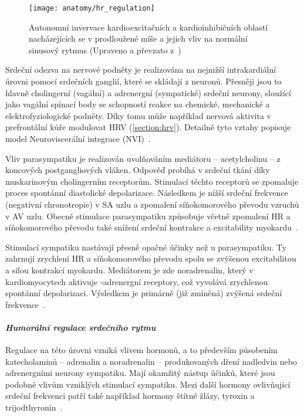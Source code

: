 \begin{figure}[h]
	\begin{center}
		\texttt{[image: anatomy/hr\_regulation]}
		\caption{Autonomní invervace kardioexcitačních a kardioinhibičních
			oblastí nacházejících se v prodloužené míše a jejich vliv na
			normální sinusový rytmus (Upraveno a převzato z~\cite{OpenStax})}
		\label{fig:hr_regulation}
	\end{center}
\end{figure}

Srdeční odezva na nervové podněty je realizována na nejnižší intrakardiální
úrovni pomocí srdečních ganglií, které se skládají z neuronů. Přesněji jsou to
hlavně cholingerní (vagální) a adrenergní (sympatické) srdeční neurony, sloužící
jako vagální spínací body se schopností reakce na chemické, mechanické a
elektrofyziologické podněty. Díky tomu může například nervová aktivita v
prefrontální kůře modulovat HRV (\ref{section:hrv}). Detailně tyto vztahy
popisuje model Neuroviscerální integrace (NVI)~\cite{Smith2017}.

Vliv parasympatiku je realizován uvolňováním mediátoru -- acetylcholinu -- z
koncových postgangliových vláken. Odpověď probíhá v srdeční tkání díky
muskarinovým cholingerním receptorům. Stimulací těchto receptorů se zpomaluje
proces spontánní diastolické depolarizace. Následkem je nižší srdeční frekvence
(negativní chronotropie) v SA uzlu a zpomalení síňokomorového převodu vzruchů v
AV uzlu. Obecně stimulace parasympatiku způsobuje včetně zpomalení HR a
síňokomorového převodu také snížení srdeční kontrakce a excitability
myokardu~\cite{Kittnar2020}.

Stimulací sympatiku nastávají přesně opačné účinky než u parasympatiku. Ty
zahrnují zrychlení HR a síňokomorového převodu spolu se zvýšenou excitabilitou a
silou kontrakcí myokardu. Mediátorem je zde noradrenalin, který v
kardiomyocytech aktivuje \textbeta-adrenergní receptory, což vyvolává zrychlenou
spontánní depolarizaci. Výsledkem je primárně (již zmíněná) zvýšená srdeční
frekvence~\cite{Kittnar2020}.

\paragraph*{\textit{Humorální regulace srdečního rytmu}\\} Regulace na této
úrovni vzniká vlivem hormonů, a to především působením katecholaminů --
adrenalin a noradrenalin -- produkovaných dření nadledvin nebo adrenergními
neurony sympatiku. Mají okamžitý nástup účinků, které jsou podobné vlivům
vzniklých stimulací sympatiku. Mezi další hormony ovlivňující srdeční frekvenci
patří také například hormony štítné žlázy, tyroxin a
trijodthyronin~\cite{Kittnar2020,Orel2019}.

